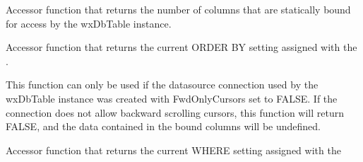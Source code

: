 
Accessor function that returns the number of columns that are statically bound for access by the wxDbTable instance.

\label{wxdbtablegetorderbyclause}


Accessor function that returns the current ORDER BY setting assigned with the .

\label{wxdbtablegetprev}



This function can only be used if the datasource connection used by the wxDbTable instance was created with FwdOnlyCursors set to FALSE.  If the connection does not allow backward scrolling cursors, this function will return FALSE, and the data contained in the bound columns will be undefined.




\label{wxdbtablegetquerytablename}



\label{wxdbtablegetrownum}



\label{wxdbtablegettablename}



\label{wxdbtablegettablepath}



\label{wxdbtablegetwhereclause}


Accessor function that returns the current WHERE setting assigned with the 

